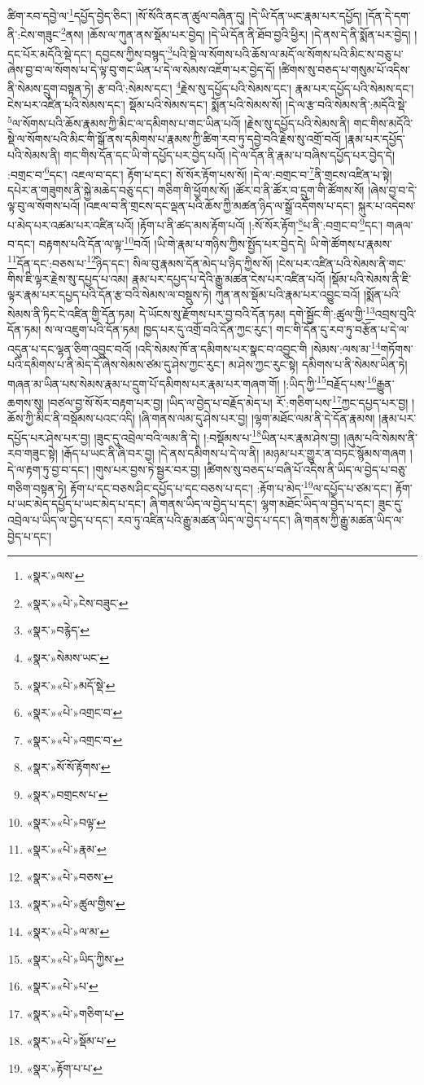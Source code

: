 ཚིག་རབ་དབྱེ་ལ་\footnote{«སྣར་»ལས་}དཔྱོད་བྱེད་ཅིང་། །སོ་སོའི་ནང་ན་ཚུལ་བཞིན་དུ། །དེ་ཡི་དོན་ཡང་རྣམ་པར་དཔྱོད། །དོན་དེ་དག་ནི་:ངེས་གཟུང་\footnote{«སྣར་»«པེ་»ངེས་བཟུང་}ནས། །ཆོས་ལ་ཀུན་ནས་སྡོམ་པར་བྱེད། །དེ་ཡི་དོན་ནི་ཐོབ་བྱའི་ཕྱིར། །དེ་ནས་དེ་ནི་སྨོན་པར་བྱེད། །དང་པོར་མདོའི་སྡེ་དང་། དབྱངས་ཀྱིས་བསྙད་\footnote{«སྣར་»བརྙེད་}པའི་སྡེ་ལ་སོགས་པའི་ཆོས་ལ་མདོ་ལ་སོགས་པའི་མིང་ས་བཅུ་པ་ཞེས་བྱ་བ་ལ་སོགས་པ་དེ་ལྟ་བུ་གང་ཡིན་པ་དེ་ལ་སེམས་འཇོག་པར་བྱེད་དོ། །ཚིགས་སུ་བཅད་པ་གསུམ་པོ་འདིས་ནི་སེམས་དྲུག་བསྟན་ཏེ། རྩ་བའི་:སེམས་དང་། \footnote{«སྣར་»སེམས་ཡང་}རྗེས་སུ་དཔྱོད་པའི་སེམས་དང་། རྣམ་པར་དཔྱོད་པའི་སེམས་དང་། ངེས་པར་འཛིན་པའི་སེམས་དང་། སྡོམ་པའི་སེམས་དང་། སྨོན་པའི་སེམས་སོ། །དེ་ལ་རྩ་བའི་སེམས་ནི་:མདོའི་སྡེ་\footnote{«སྣར་»«པེ་»མདོ་སྡེ་}ལ་སོགས་པའི་ཆོས་རྣམས་ཀྱི་མིང་ལ་དམིགས་པ་གང་ཡིན་པའོ། །རྗེས་སུ་དཔྱོད་པའི་སེམས་ནི། གང་གིས་མདོའི་སྡེ་ལ་སོགས་པའི་མིང་གི་སྒོ་ནས་དམིགས་པ་རྣམས་ཀྱི་ཚིག་རབ་ཏུ་དབྱེ་བའི་རྗེས་སུ་འགྲོ་བའོ། །རྣམ་པར་དཔྱོད་པའི་སེམས་ནི། གང་གིས་དོན་དང་ཡི་གེ་དཔྱོད་པར་བྱེད་པའོ། །དེ་ལ་དོན་ནི་རྣམ་པ་བཞིས་དཔྱོད་པར་བྱེད་དེ། :བགྲང་བ་\footnote{«སྣར་»«པེ་»འགྲང་བ་}དང་། འཇལ་བ་དང་། རྟོག་པ་དང་། སོ་སོར་རྟོག་པས་སོ། །དེ་ལ་:བགྲང་བ་\footnote{«སྣར་»«པེ་»འགྲང་བ་}ནི་གྲངས་འཛིན་པ་སྟེ། དཔེར་ན་གཟུགས་ནི་སྐྱེ་མཆེད་བཅུ་དང་། གཅིག་གི་ཕྱོགས་སོ། །ཚོར་བ་ནི་ཚོར་བ་དྲུག་གི་ཚོགས་སོ། །ཞེས་བྱ་བ་དེ་ལྟ་བུ་ལ་སོགས་པའོ། །འཇལ་བ་ནི་གྲངས་དང་ལྡན་པའི་ཆོས་ཀྱི་མཚན་ཉིད་ལ་སྒྲོ་འདོགས་པ་དང་། སྐུར་པ་འདེབས་པ་མེད་པར་འཚམ་པར་འཛིན་པའོ། །རྟོག་པ་ནི་ཚད་མས་རྟོག་པའོ། །:སོ་སོར་རྟོག་\footnote{«སྣར་»སོ་སོ་རྟོགས་}པ་ནི་:བགྲང་བ་\footnote{«སྣར་»བགྲངས་པ་}དང་། གཞལ་བ་དང་། བརྟགས་པའི་དོན་ལ་ལྟ་\footnote{«སྣར་»«པེ་»བལྟ་}བའོ། །ཡི་གེ་རྣམ་པ་གཉིས་ཀྱིས་སྤྱོད་པར་བྱེད་དེ། ཡི་གེ་ཚོགས་པ་རྣམས་\footnote{«སྣར་»«པེ་»རྣམ་}དོན་དང་:བཅས་པ་\footnote{«སྣར་»«པེ་»བཅས་}ཉིད་དང་། སིལ་བུ་རྣམས་དོན་མེད་པ་ཉིད་ཀྱིས་སོ། །ངེས་པར་འཛིན་པའི་སེམས་ནི་གང་གིས་ཇི་ལྟར་རྗེས་སུ་དཔྱད་པ་འམ། རྣམ་པར་དཔྱད་པ་དེའི་རྒྱུ་མཚན་ངེས་པར་འཛིན་པའོ། །སྡོམ་པའི་སེམས་ནི་ཇི་ལྟར་རྣམ་པར་དཔྱད་པའི་དོན་རྩ་བའི་སེམས་ལ་བསྡུས་ཏེ། ཀུན་ནས་སྡོམ་པའི་རྣམ་པར་འབྱུང་བའོ། །སྨོན་པའི་སེམས་ནི་ཏིང་ངེ་འཛིན་གྱི་དོན་ཏམ། དེ་ཡོངས་སུ་རྫོགས་པར་བྱ་བའི་དོན་ཏམ། དགེ་སྦྱོང་གི་:ཚུལ་གྱི་\footnote{«སྣར་»«པེ་»ཚུལ་གྱིས་}འབྲས་བུའི་དོན་ཏམ། ས་ལ་འཇུག་པའི་དོན་ཏམ། ཁྱད་པར་དུ་འགྲོ་བའི་དོན་ཀྱང་རུང་། གང་གི་དོན་དུ་རབ་ཏུ་བརྩོན་པ་དེ་ལ་འདུན་པ་དང་ལྷན་ཅིག་འབྱུང་བའོ། །འདི་སེམས་ཁོ་ན་དམིགས་པར་སྣང་བ་འབྱུང་གི །སེམས་:ལས་མ་\footnote{«སྣར་»«པེ་»ལ་མ་}གཏོགས་པའི་དམིགས་པ་ནི་མེད་དོ་ཞེས་སེམས་ཙམ་དུ་ཤེས་ཀྱང་རུང་། མ་ཤེས་ཀྱང་རུང་སྟེ། དམིགས་པ་ནི་སེམས་ཡིན་ཏེ། གཞན་མ་ཡིན་པས་སེམས་རྣམ་པ་དྲུག་པོ་དམིགས་པར་རྣམ་པར་གཞག་གོ། །:ཡིད་ཀྱི་\footnote{«སྣར་»«པེ་»ཡིད་ཀྱིས་}བརྗོད་པས་\footnote{«སྣར་»«པེ་»པ་}རྒྱུན་ཆགས་སུ། །བཙལ་བྱ་སོ་སོར་བརྟག་པར་བྱ། །ཡིད་ལ་བྱེད་པ་བརྗོད་མེད་པ། རོ་:གཅིག་པས་\footnote{«སྣར་»«པེ་»གཅིག་པ་}ཀྱང་དཔྱད་པར་བྱ། །ཆོས་ཀྱི་མིང་ནི་བསྡོམས་པའང་འདི། །ཞི་གནས་ལམ་དུ་ཤེས་པར་བྱ། །ལྷག་མཐོང་ལམ་ནི་དེ་དོན་རྣམས། །རྣམ་པར་དཔྱོད་པར་ཤེས་པར་བྱ། །ཟུང་དུ་འབྲེལ་བའི་ལམ་ནི་དེ། །:བསྡོམས་པ་\footnote{«སྣར་»«པེ་»སྡོམ་པ་}ཡིན་པར་རྣམ་ཤེས་བྱ། །ཞུམ་པའི་སེམས་ནི་རབ་གཟུང་སྟེ། །རྒོད་པ་ཡང་ནི་ཞི་བར་བྱ། །དེ་ནས་དམིགས་པ་དེ་ལ་ནི། །མཉམ་པར་གྱུར་ན་བཏང་སྙོམས་གཞག །དེ་ལ་རྟག་ཏུ་བྱ་བ་དང་། །གུས་པར་བྱས་ཏེ་སྦྱར་བར་བྱ། །ཚིགས་སུ་བཅད་པ་བཞི་པོ་འདིས་ནི་ཡིད་ལ་བྱེད་པ་བཅུ་གཅིག་བསྟན་ཏེ། རྟོག་པ་དང་བཅས་ཤིང་དཔྱོད་པ་དང་བཅས་པ་དང་། :རྟོག་པ་མེད་\footnote{«སྣར་»རྟོག་པ་པ་}ལ་དཔྱོད་པ་ཙམ་དང་། རྟོག་པ་ཡང་མེད་དཔྱོད་པ་ཡང་མེད་པ་དང་། ཞི་གནས་ཡིད་ལ་བྱེད་པ་དང་། ལྷག་མཐོང་ཡིད་ལ་བྱེད་པ་དང་། ཟུང་དུ་འབྲེལ་པ་ཡིད་ལ་བྱེད་པ་དང་། རབ་ཏུ་འཛིན་པའི་རྒྱུ་མཚན་ཡིད་ལ་བྱེད་པ་དང་། ཞི་གནས་ཀྱི་རྒྱུ་མཚན་ཡིད་ལ་བྱེད་པ་དང་། 